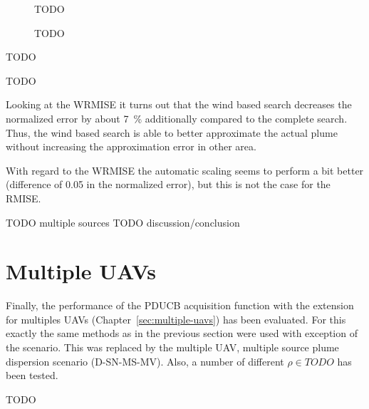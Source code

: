 \begin{figure}
    TODO
    \caption[TODO]{TODO}\label{fig:noisy-ss}
\end{figure}

\begin{table}
    TODO
    \caption[TODO]{TODO}\label{tbl:noisy-ss}
\end{table}

Looking at the WRMISE it turns out that the wind based search decreases the 
normalized error by about \SI{7}{\percent} additionally compared to the complete 
search. Thus, the wind based search is able to better approximate the actual 
plume without increasing the approximation error in other area.

With regard to the WRMISE the automatic scaling seems to perform a bit better 
(difference of \num{0.05} in the normalized error), but this is not the case for 
the RMISE\@.

TODO multiple sources
TODO discussion/conclusion

\section{Multiple UAVs}
Finally, the performance of the PDUCB acquisition function with the extension 
for multiples UAVs (Chapter~\ref{sec:multiple-uavs}) has been evaluated. For 
this exactly the same methods as in the previous section were used with 
exception of the scenario. This was replaced by the multiple UAV, multiple 
source plume dispersion scenario (D-SN-MS-MV). Also, a number of different $\rho 
\in TODO$ has been tested.

TODO
